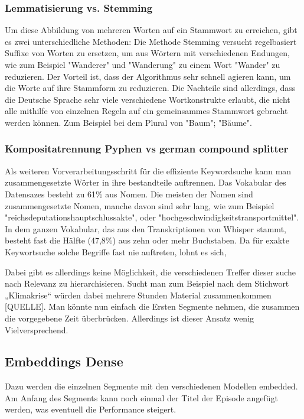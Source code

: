 \subsubsection{Lemmatisierung vs. Stemming}

Um diese Abbildung von mehreren Worten auf ein Stammwort zu erreichen, gibt es zwei unterschiedliche Methoden:
Die Methode Stemming versucht regelbasiert Suffixe von Worten zu ersetzen, um aus Wörtern mit verschiedenen Endungen, wie zum Beispiel "Wanderer" und "Wanderung" zu einem Wort "Wander" zu reduzieren.
Der Vorteil ist, dass der Algorithmus sehr schnell agieren kann, um die Worte auf ihre Stammform zu reduzieren.
Die Nachteile sind allerdings, dass die Deutsche Sprache sehr viele verschiedene Wortkonstrukte erlaubt, die nicht alle mithilfe von einzelnen Regeln auf ein gemeinsammes Stammwort gebracht werden können. 
Zum Beispiel bei dem Plural von "Baum"; "Bäume".


\subsubsection{Kompositatrennung Pyphen vs german compound splitter}

Als weiteren Vorverarbeitungsschritt für die effiziente Keywordsuche kann man zusammengesetzte Wörter in ihre bestandteile auftrennen.
Das Vokabular des Datensazes besteht zu 61\% aus Nomen. 
Die meisten der Nomen sind zusammengesetzte Nomen, manche davon sind sehr lang, wie zum Beispiel "reichsdeputationshauptschlussakte", oder "hochgeschwindigkeitstransportmittel".
In dem ganzen Vokabular, das aus den Transkriptionen von Whisper stammt, besteht fast die Hälfte (47,8\%) aus zehn oder mehr Buchstaben.
Da für exakte Keywortsuche solche Begriffe fast nie auftreten, lohnt es sich, 



Dabei gibt es allerdings keine Möglichkeit, die verschiedenen Treffer dieser suche nach Relevanz zu hierarchisieren. Sucht man zum Beispiel nach dem Stichwort „Klimakrise“ würden dabei mehrere Stunden Material zusammenkommen [QUELLE]. 
Man könnte nun einfach die Ersten Segmente nehmen, die zusammen die vorgegebene Zeit überbrücken. Allerdings ist dieser Ansatz wenig Vielversprechend. 


\subsection{Embeddings Dense}

Dazu werden die einzelnen Segmente mit den verschiedenen Modellen embedded.
Am Anfang des Segments kann noch einmal der Titel der Episode angefügt werden, was eventuell die Performance steigert.\cite{jones2021}


